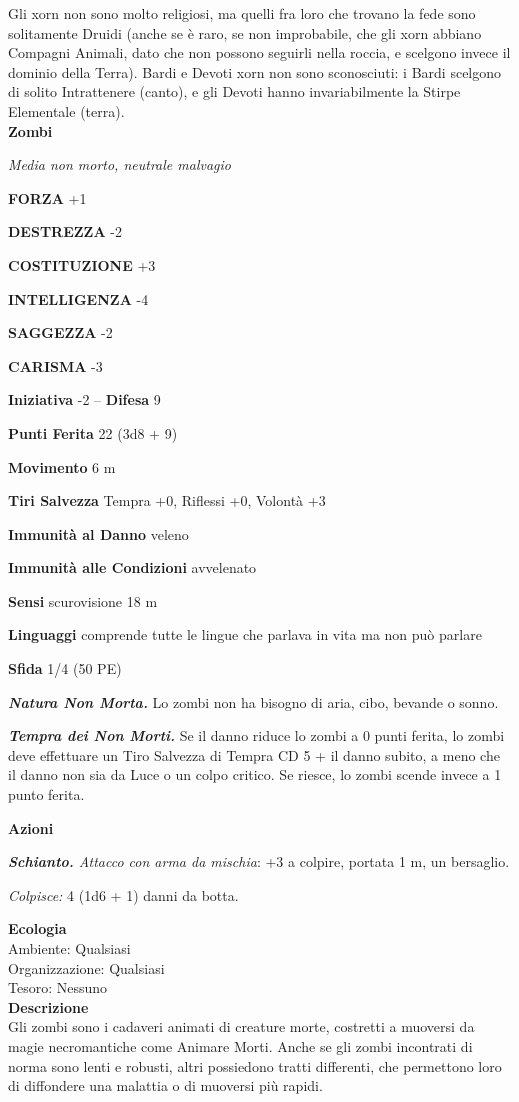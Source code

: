 \begin{multicols}{2}
Gli xorn non sono molto religiosi, ma quelli fra loro che trovano la fede sono solitamente Druidi (anche se è raro, se non improbabile, che gli xorn abbiano Compagni Animali, dato che non possono seguirli nella roccia, e scelgono invece il dominio della Terra). Bardi e Devoti xorn non sono sconosciuti: i Bardi scelgono di solito Intrattenere (canto), e gli Devoti hanno invariabilmente la Stirpe Elementale (terra).\\


\medskip{}\textbf{Zombi}

\emph{Media non morto, neutrale malvagio}

\textbf{FORZA} +1

\textbf{DESTREZZA} -2

\textbf{COSTITUZIONE} +3

\textbf{INTELLIGENZA} -4

\textbf{SAGGEZZA} -2

\textbf{CARISMA} -3

\textbf{Iniziativa} -2 -- \textbf{Difesa} 9

\textbf{Punti Ferita} 22 (3d8 + 9)

\textbf{Movimento} 6 m

\textbf{Tiri Salvezza}  Tempra +0, Riflessi +0, Volontà +3

\textbf{Immunità al Danno} veleno

\textbf{Immunità alle Condizioni} avvelenato

\textbf{Sensi} scurovisione 18 m

\textbf{Linguaggi} comprende tutte le lingue che parlava in vita ma non può parlare

\textbf{Sfida} 1/4 (50 PE)

\emph{\textbf{Natura Non Morta.}} Lo zombi non ha bisogno di aria, cibo, bevande o sonno.

\emph{\textbf{Tempra dei Non Morti.}} Se il danno riduce lo zombi a 0 punti ferita, lo zombi deve effettuare un Tiro Salvezza di Tempra CD 5 + il danno subito, a meno che il danno non sia da Luce o un colpo critico. Se riesce, lo zombi scende invece a 1 punto ferita.

\textbf{Azioni}

\emph{\textbf{Schianto.} Attacco con arma da mischia}: +3 a colpire, portata 1 m, un bersaglio.

\emph{Colpisce:} 4 (1d6 + 1) danni da botta.

\textbf{Ecologia}\\
Ambiente: Qualsiasi\\
Organizzazione: Qualsiasi\\
Tesoro: Nessuno\\
\textbf{Descrizione}\\
Gli zombi sono i cadaveri animati di creature morte, costretti a muoversi da magie necromantiche come Animare Morti. Anche se gli zombi incontrati di norma sono lenti e robusti, altri possiedono tratti differenti, che permettono loro di diffondere una malattia o di muoversi più rapidi.\\


\end{multicols}
